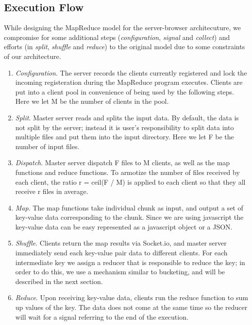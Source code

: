 \subsection{Execution Flow}

While designing the MapReduce model for the server-browser architecuture, we compromise for some additional steps (\emph{configuration}, \emph{signal} and \emph{collect}) and efforts (in \emph{split}, \emph{shuffle} and \emph{reduce}) to the original model due to some constraints of our architecture.

\begin{enumerate}

\item \emph{Configuration}. The server records the clients currently registered and lock the incoming registeration during the MapReduce program executes. Clients are put into a client pool in convenience of being used by the following steps. Here we let M be the number of clients in the pool.

\item \emph{Split}. Master server reads and splits the input data. By default, the data is not split by the server; instead it is user's responsibility to split data into multiple files and put them into the input directory. Here we let F be the number of input files.

\item \emph{Dispatch}. Master server dispatch F files to M clients, as well as the map functions and reduce functions. To armotize the number of files received by each client, the ratio r = ceil(F / M) is applied to each client so that they all receive r files in average.

\item \emph{Map}. The map functions take individual chunk as input, and output a set of key-value data corresponding to the chunk. Since we are using javascript the key-value data can be easy represented as a javascript object or a JSON.

\item \emph{Shuffle}. Clients return the map results via Socket.io, and master server immediately send each key-value pair data to different clients. For each intermediate key we assign a reducer that is responsible to reduce the key; in order to do this, we use a mechanism similar to bucketing, and will be described in the next section.

\item \emph{Reduce}. Upon receiving key-value data, clients run the reduce function to sum up values of the key. The data does not come at the same time so the reducer will wait for a signal referring to the end of the execution.


\end{enumerate}
